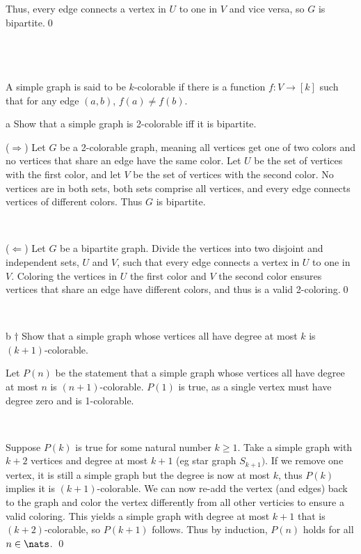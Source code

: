 \documentclass{article}
\begin{document}
Thus, every edge connects a vertex in $U$ to one in $V$ and vice versa, so $G$ is bipartite.\qed

\
\hline
\section{}

\begin{problem*}
A simple graph is said to be $k$-colorable if there is a function $f:V \to [k]$ such that for any edge $(a, b)$, $f(a) \neq f(b)$.
\end{problem*}

\begin{problem} a
Show that a simple graph is 2-colorable iff it is bipartite.
\end{problem}

($ \Rightarrow $) Let $ G$ be a 2-colorable graph, meaning all vertices get one of two colors and no vertices that share an edge have the same color. Let $ U$ be the set of vertices with the first color, and let $ V$ be the set of vertices with the second color. No vertices are in both sets, both sets comprise all vertices, and every edge connects vertices of different colors. Thus $ G$ is bipartite.

\

($ \Leftarrow $) Let $ G$ be a bipartite graph. Divide the vertices into two disjoint and independent sets, $U$ and $V$, such that every edge connects a vertex in $U$ to one in $V$. Coloring the vertices in $ U$ the first color and $ V$ the second color ensures vertices that share an edge have different colors, and thus is a valid 2-coloring.\qed

\

\begin{problem} b
$\dagger$ Show that a simple graph whose vertices all have degree at most $k$ is $(k+1)$-colorable.
\end{problem}

Let $ P( n)$ be the statement that a simple graph whose vertices all have degree at most $ n$ is $(n+1)$-colorable. $ P( 1)$ is true, as a single vertex must have degree zero and is 1-colorable.

\

Suppose $ P( k)$ is true for some natural number $ k\geq 1$. Take a simple graph with $ k+2$ vertices and degree at most $ k+1$ (eg star graph $ S_{k+1})$. If we remove one vertex, it is still a simple graph but the degree is now at most $ k$, thus $ P( k)$ implies it is $ ( k+1)$-colorable. We can now re-add the vertex (and edges) back to the graph and color the vertex differently from all other verticies to ensure a valid coloring. This yields a simple graph with degree at most $ k+1$ that is $ ( k+2)$-colorable, so $ P( k+1)$ follows. Thus by induction, $P(n)$ holds for all $n \in \nats$. \qed 

\
\hline
\end{document}

